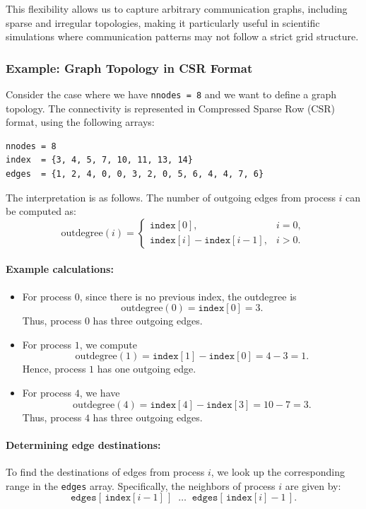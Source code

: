 \documentclass[12pt]{book}
\begin{document}
This flexibility allows us to capture arbitrary communication graphs, including sparse and irregular topologies, making it particularly useful in scientific simulations where communication patterns may not follow a strict grid structure.

\subsubsection*{Example: Graph Topology in CSR Format}

Consider the case where we have \texttt{nnodes = 8} and we want to define a graph topology. The connectivity is represented in Compressed Sparse Row (CSR) format, using the following arrays:

\begin{lstlisting}[style=cppstyle]
nnodes = 8
index  = {3, 4, 5, 7, 10, 11, 13, 14}
edges  = {1, 2, 4, 0, 0, 3, 2, 0, 5, 6, 4, 4, 7, 6}
\end{lstlisting}

The interpretation is as follows.  
The number of outgoing edges from process $i$ can be computed as:
\[
\text{outdegree}(i) = 
\begin{cases}
\texttt{index}[0], & i = 0, \\
\texttt{index}[i] - \texttt{index}[i-1], & i > 0.
\end{cases}
\]

\paragraph{Example calculations:}
\begin{itemize}
    \item For process $0$, since there is no previous index, the outdegree is
    \[
    \text{outdegree}(0) = \texttt{index}[0] = 3.
    \]
    Thus, process $0$ has three outgoing edges.
    
    \item For process $1$, we compute
    \[
    \text{outdegree}(1) = \texttt{index}[1] - \texttt{index}[0] = 4 - 3 = 1.
    \]
    Hence, process $1$ has one outgoing edge.

    \item For process $4$, we have
    \[
    \text{outdegree}(4) = \texttt{index}[4] - \texttt{index}[3] = 10 - 7 = 3.
    \]
    Thus, process $4$ has three outgoing edges.
\end{itemize}

\paragraph{Determining edge destinations:}
To find the destinations of edges from process $i$, we look up the corresponding range in the \texttt{edges} array. Specifically, the neighbors of process $i$ are given by:
\[
\texttt{edges}[\,\texttt{index}[i-1]\,] \;\; \ldots \;\; \texttt{edges}[\,\texttt{index}[i]-1\,].
\]
\end{document}
